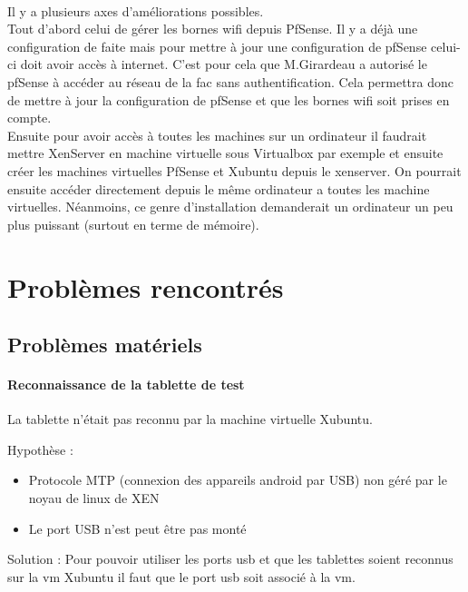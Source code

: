 \documentclass[a4paper,12pt]{extarticle}
\begin{document}
\paragraph{}
Il y a plusieurs axes d’améliorations possibles. \\
Tout d’abord celui de gérer les bornes wifi depuis PfSense. Il y a déjà une configuration de faite mais pour mettre à jour une configuration de pfSense celui-ci doit avoir accès à internet. C’est pour cela que M.Girardeau a autorisé le pfSense à accéder au réseau de la fac sans authentification. Cela permettra donc de mettre à jour la configuration de pfSense et que les bornes wifi soit prises en compte.\\ 
Ensuite pour avoir accès à toutes les machines sur un ordinateur il faudrait mettre XenServer en machine virtuelle sous Virtualbox par exemple et ensuite créer les machines virtuelles PfSense et Xubuntu depuis le xenserver. On pourrait ensuite accéder directement depuis le même ordinateur a toutes les machine virtuelles. Néanmoins, ce genre d’installation demanderait un ordinateur un peu plus puissant (surtout en terme de mémoire).


\clearpage
\section{Problèmes rencontrés}

\subsection{Problèmes matériels}

\paragraph{Reconnaissance de la tablette de test\\}

La tablette n’était pas reconnu par la machine virtuelle Xubuntu.

Hypothèse :
\begin{itemize}
\item Protocole MTP (connexion des appareils android par USB) non géré par le noyau de linux de XEN
\item Le port USB n’est peut être pas monté \\
\end{itemize}

Solution :
Pour pouvoir utiliser les ports usb et que les tablettes soient reconnus sur la vm Xubuntu il faut que le port usb soit associé à la vm. 
\end{document}

